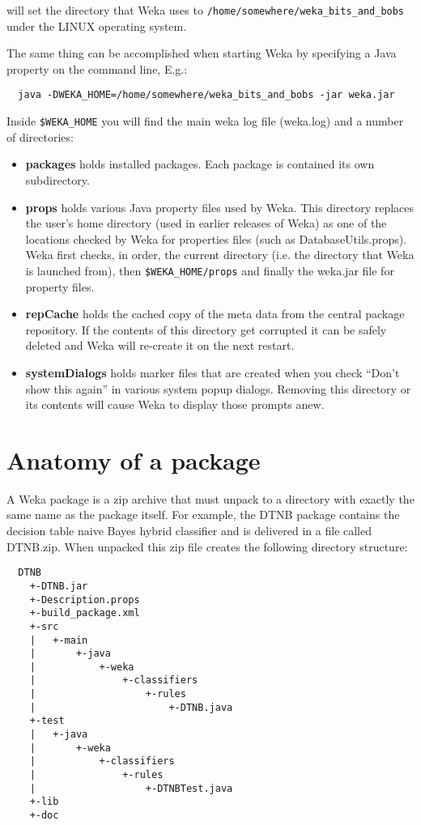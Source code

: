 will set the directory that Weka uses to
\verb=/home/somewhere/weka_bits_and_bobs= under the
LINUX operating system.

The same thing can be accomplished when starting Weka by
specifying a Java property on the command line, E.g.:

{\scriptsize
\begin{verbatim}
  java -DWEKA_HOME=/home/somewhere/weka_bits_and_bobs -jar weka.jar
\end{verbatim}}

Inside \verb=$WEKA_HOME= you will find the main weka log file (weka.log)
and a number of directories:

\begin{itemize}
\item \textbf{packages} holds installed packages. Each package is
  contained its own subdirectory.
\item \textbf{props} holds various Java property files used by
  Weka. This directory replaces the user's home directory (used in
  earlier releases of Weka) as one of the locations checked by Weka
  for properties files (such as DatabaseUtils.props). Weka first
  checks, in order, the current directory (i.e. the directory that
  Weka is launched from), then \verb=$WEKA_HOME/props= and finally the
  weka.jar file for property files.
\item \textbf{repCache} holds the cached copy of the meta data from
  the central package repository. If the contents of this directory
  get corrupted it can be safely deleted and Weka will re-create it on
  the next restart.
\item \textbf{systemDialogs} holds marker files that are created when
  you check ``Don't show this again'' in various system popup
  dialogs. Removing this directory or its contents will cause Weka to
  display those prompts anew.
\end{itemize}

\section{Anatomy of a package}

A Weka package is a zip archive that must unpack to a directory with
exactly the same name as the package itself. For example, the DTNB
package contains the decision table naive Bayes hybrid classifier and
is delivered in a file called DTNB.zip. When unpacked this zip file
creates the following directory structure:

{\scriptsize
\begin{verbatim}
  DTNB
    +-DTNB.jar
    +-Description.props
    +-build_package.xml
    +-src
    |   +-main
    |       +-java
    |           +-weka
    |               +-classifiers
    |                   +-rules
    |                       +-DTNB.java
    +-test
    |   +-java
    |       +-weka
    |           +-classifiers
    |               +-rules
    |                   +-DTNBTest.java
    +-lib
    +-doc
\end{verbatim}}

